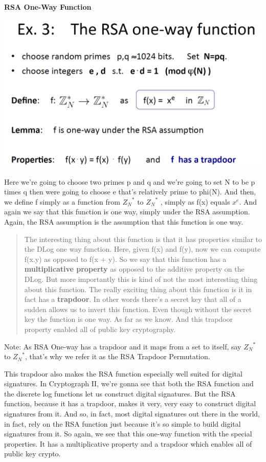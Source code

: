 \documentclass[11pt]{article}
\makeatletter
\def\maxwidth{\ifdim\Gin@nat@width>\linewidth\linewidth
    \else\Gin@nat@width\fi}
\let\Oldincludegraphics\includegraphics
\renewcommand{\includegraphics}[1]{\Oldincludegraphics[width=.8\maxwidth]{#1}}
\makeatother
\begin{document}
\textbf{RSA One-Way Function}

\includegraphics{./Images/RSA1WayFxn.png}

Here we're going to choose two primes p and q and we're going to set N
to be p times q then were going to choose e that's relatively prime to
phi(N). And then, we define f simply as a function from \({Z_N}^{*}\) to
\({Z_N}^{*}\) , simply as f(x) equals \(x^e\). And again we say that
this function is one way, simply under the RSA assumption. Again, the
RSA assumption is the assumption that this function is one way.

\begin{quote}
The interesting thing about this function is that it has properties
similar to the DLog one way function. Here, given f(x) and f(y), now we
can compute f(x.y) as opposed to f(x + y). So we say that this function
has a \textbf{multiplicative property} as opposed to the additive
property on the DLog. But more importantly this is kind of not the most
interesting thing about this function. The really exciting thing about
this function is it in fact has a \textbf{trapdoor}. In other words
there's a secret key that all of a sudden allows us to invert this
function. Even though without the secret key the function is one way. As
far as we know. And this trapdoor property enabled all of public key
cryptography.
\end{quote}

Note: As RSA One-way has a trapdoor and it maps from a set to itself,
say \({Z_N}^{*}\) to \({Z_N}^{*}\), that's why we refer it as the RSA
Trapdoor Permutation.

This trapdoor also makes the RSA function especially well suited for
digital signatures. In Cryptograph II, we're gonna see that both the RSA
function and the discrete log functions let us construct digital
signatures. But the RSA function, because it has a trapdoor, makes it
very, very easy to construct digital signatures from it. And so, in
fact, most digital signatures out there in the world, in fact, rely on
the RSA function just because it's so simple to build digital signatures
from it. So again, we see that this one-way function with the special
properties. It has a multiplicative property and a trapdoor which
enables all of public key crypto.
\end{document}
